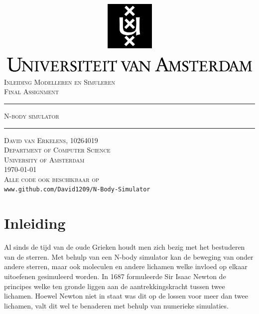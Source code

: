 \documentclass[12pt]{article}
\begin{document}
\begin{titlepage}
\begin{center}
    \includegraphics[width=\textwidth]{./logo.png}
    \\ [2.5cm]
    \textsc{\Large Inleiding Modelleren en Simuleren}
    \\ [0.5cm]
    \textsc{\large Final Assignment}
    \\ [1cm]
    \hrule
    \vspace{0.3cm}
    \textsc{N-body simulator}
    \\ [0.3cm]
    \hrule
    \vfill
    \textsc{David van Erkelens, 10264019 \\[0.7cm] Department of Computer Science \\ University of Amsterdam \\[0.4cm] \today \\[0.5cm] Alle code ook beschikbaar op}
    \\
    \verb|www.github.com/David1209/N-Body-Simulator|
\end{center}
\end{titlepage}
\tableofcontents
\clearpage
\section{Inleiding}
Al sinds de tijd van de oude Grieken houdt men zich bezig met het bestuderen van de sterren. Met behulp van een N-body simulator kan de beweging van onder andere sterren, maar ook moleculen en andere lichamen welke invloed op elkaar uitoefenen gesimuleerd worden. In 1687 formuleerde Sir Isaac Newton de principes welke ten gronde liggen aan de aantrekkingskracht tussen twee lichamen. Hoewel Newton niet in staat was dit op de lossen voor meer dan twee lichamen, valt dit wel te benaderen met behulp van numerieke simulaties.
\end{document}
